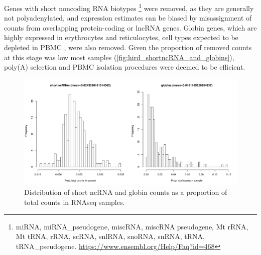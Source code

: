 Genes with short noncoding RNA biotypes \footnote{miRNA, miRNA\_pseudogene, miscRNA, miscRNA pseudogene, Mt rRNA, Mt tRNA, rRNA, scRNA, snlRNA, snoRNA, snRNA, tRNA, tRNA\_pseudogene. \url{https://www.ensembl.org/Help/Faq?id=468}} were removed, as they are generally not polyadenylated, and expression estimates can be biased by misassignment of counts from overlapping protein-coding or lncRNA genes\autocite{zhao2018EvaluationTwoMain}.
Globin genes, which are highly expressed in erythrocytes and reticulocytes, cell types expected to be depleted in \gls{PBMC} \autocite{min2010VariabilityGeneExpression}, were also removed.
Given the proportion of removed counts at this stage was low most samples (\autoref{fig:hird_shortncRNA_and_globins}), poly(A) selection and \gls{PBMC} isolation procedures were deemed to be efficient.

\begin{figure}
    \centering
    \includegraphics[width=1.0\textwidth, page=1]{mainmatter/figures/chapter_02/rnaseq_data_setup.per_sample.short_ncRNA_globin_levels_hist.pdf}
    \caption{Distribution of short ncRNA and globin counts as a proportion of total counts in \gls{RNAseq} samples.}
    \label{fig:hird_shortncRNA_and_globins}
\end{figure}


